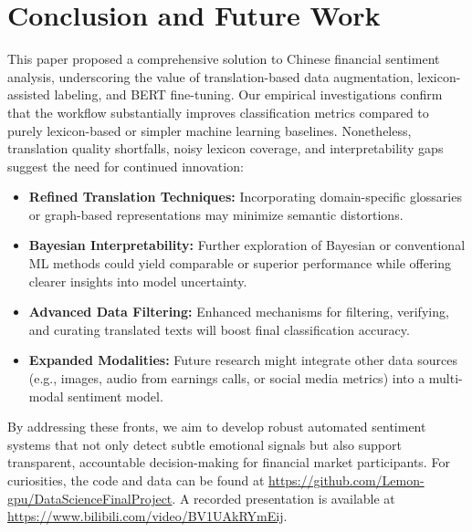 \documentclass[12pt]{article}
\begin{document}
\section{Conclusion and Future Work}
\label{sec:conclusion}

This paper proposed a comprehensive solution to Chinese financial sentiment analysis, underscoring the value of translation-based data augmentation, lexicon-assisted labeling, and BERT fine-tuning. Our empirical investigations confirm that the workflow substantially improves classification metrics compared to purely lexicon-based or simpler machine learning baselines. Nonetheless, translation quality shortfalls, noisy lexicon coverage, and interpretability gaps suggest the need for continued innovation:

\begin{itemize}
    \item \textbf{Refined Translation Techniques:} Incorporating domain-specific glossaries or graph-based representations may minimize semantic distortions.
    \item \textbf{Bayesian Interpretability:} Further exploration of Bayesian or conventional ML methods could yield comparable or superior performance while offering clearer insights into model uncertainty.
    \item \textbf{Advanced Data Filtering:} Enhanced mechanisms for filtering, verifying, and curating translated texts will boost final classification accuracy.
    \item \textbf{Expanded Modalities:} Future research might integrate other data sources (e.g., images, audio from earnings calls, or social media metrics) into a multi-modal sentiment model.
\end{itemize}

By addressing these fronts, we aim to develop robust automated sentiment systems that not only detect subtle emotional signals but also support transparent, accountable decision-making for financial market participants. For curiosities, the code and data can be found at \url{https://github.com/Lemon-gpu/DataScienceFinalProject}. A recorded presentation is available at \url{https://www.bilibili.com/video/BV1UAkRYmEij}.

\end{document}

